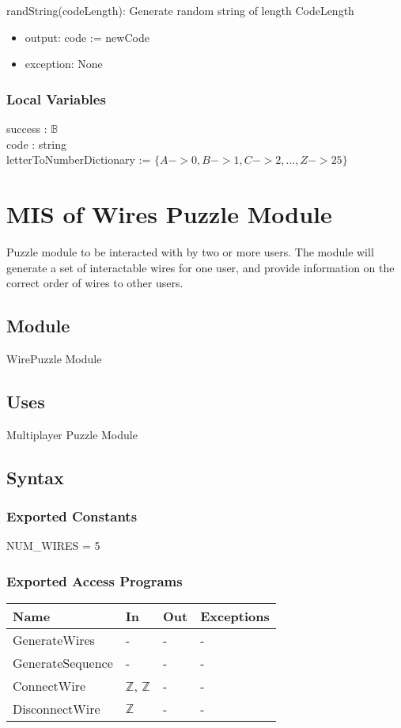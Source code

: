 \documentclass[12pt, titlepage]{article}
\begin{document}
randString(codeLength): Generate random string of length CodeLength
\begin{itemize}
    \item output: code := newCode
    \item exception: None
\end{itemize}

\subsubsection{Local Variables}
success : $\mathds{B}$\\
code : string\\
letterToNumberDictionary := $\{A -> 0, B -> 1, C -> 2, ..., Z -> 25\}$

\newpage

\section{MIS of {Wires Puzzle Module}} \label{WiresModule} 

Puzzle module to be interacted with by two or more users. The module will generate a set of interactable wires for one user, and provide information on the correct order of wires to other users.
 
\subsection{Module}
WirePuzzle Module
\subsection{Uses}
Multiplayer Puzzle Module

\subsection{Syntax}

\subsubsection{Exported Constants}
NUM\_WIRES = 5

\subsubsection{Exported Access Programs}

\begin{center}
\begin{tabular}{p{4cm} p{3cm} p{3cm} p{3cm}}
\hline
\textbf{Name} & \textbf{In} & \textbf{Out} & \textbf{Exceptions} \\
\hline
GenerateWires & - & - & - \\
GenerateSequence & - & - & - \\
ConnectWire & $\mathds{Z}$, $\mathds{Z}$ & - & - \\
DisconnectWire & $\mathds{Z}$ & - & - \\
\hline
\end{tabular}
\end{center}
\end{document}
